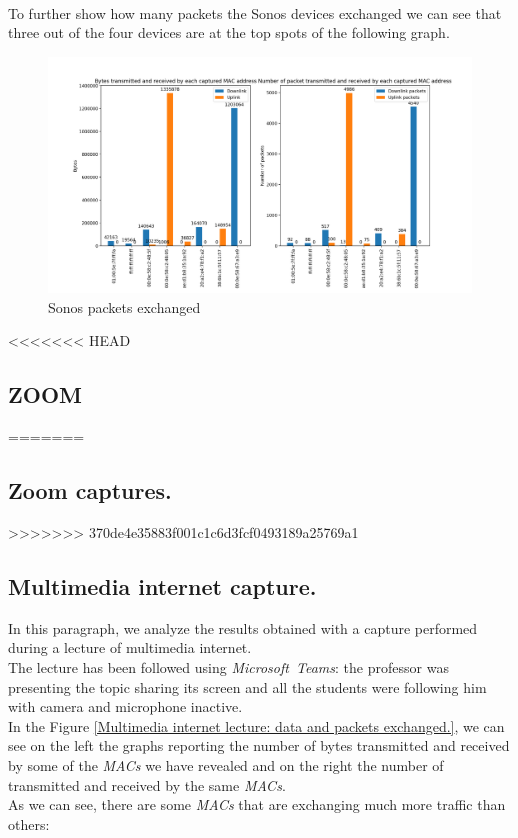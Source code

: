 \\
To further show how many packets the Sonos devices exchanged we can see that three out of the four
devices are at the top spots of the following graph.
\begin{figure}[h]
    \includegraphics[width=\textwidth]{Graphs/SONOS_bytes_packets.png}
    \caption{Sonos packets exchanged}
    \label{fig:Sonos_packets}
\end{figure}

<<<<<<< HEAD

 
\subsection{ZOOM}
=======
\subsection{Zoom captures.}
>>>>>>> 370de4e35883f001c1c6d3fcf0493189a25769a1

\subsection{Multimedia internet capture.}
In this paragraph, we analyze the results obtained with a capture performed during a lecture of
multimedia internet. \\ 
The lecture has been followed using \textit{Microsoft\ Teams}: the professor was presenting the
topic sharing its screen and all the students were following him with camera and microphone inactive.\\
In the Figure \ref{Multimedia internet lecture: data and packets exchanged.}, we can see on the
left the graphs reporting the number of bytes transmitted and received by some of the \textit{MACs}
we have revealed and on the right the number of transmitted and received by the same \textit{MACs}.\\
As we can see, there are some \textit{MACs} that are exchanging much more traffic than others:


